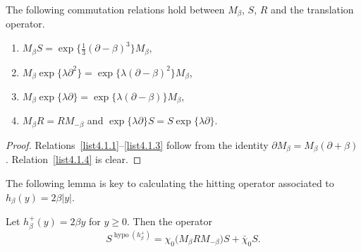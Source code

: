 \documentclass[AHL,Unicode,longabstracts]{cedram}
\DeclareMathOperator{\hypo}{hypo}
\begin{document}
\begin{lemm} \label{lem:commutator}
The following commutation relations hold between $M_{\beta}$, $S$, $R$ and the translation operator.
\begin{enumerate}
\item \label{list4.1.1}$M_{\beta} S = \exp \big \{ \frac{1}{3}(\partial - \beta)^3 \big \} M_{\beta}$,
\item \label{list4.1.2}$M_{\beta} \exp \{ \lambda \partial^2 \} = \exp \{ \lambda (\partial - \beta)^2\} M_{\beta}$,
\item \label{list4.1.3}$M_{\beta} \exp \{ \lambda \partial \} = \exp \{ \lambda (\partial - \beta)\} M_{\beta}$,
\item \label{list4.1.4}$M_{\beta}R = R M_{-\beta}$ and $\exp \{\lambda \partial\} S = S \exp \{\lambda \partial \}$.
\end{enumerate}
\end{lemm}

\begin{proof}
Relations~\eqref{list4.1.1}--\eqref{list4.1.3} follow from the identity $\partial M_{\beta} = M_{\beta} (\partial + \beta)$. Relation~\eqref{list4.1.4} is clear.
\end{proof}

The following lemma is key to calculating the hitting operator associated to $h_{\beta}(y)= 2 \beta |y|$.

\begin{lemm} \label{lem:Shypo}
Let $h^{+}_{\beta}(y)= 2 \beta y$ for $y \geq 0$. Then the operator
\[
S^{\hypo(h^{+}_{\beta})} = \chi_0 \big(M_{\beta} R M_{-\beta} \big) S + \bar{\chi}_0 S.
\]
\end{lemm}
\end{document}
